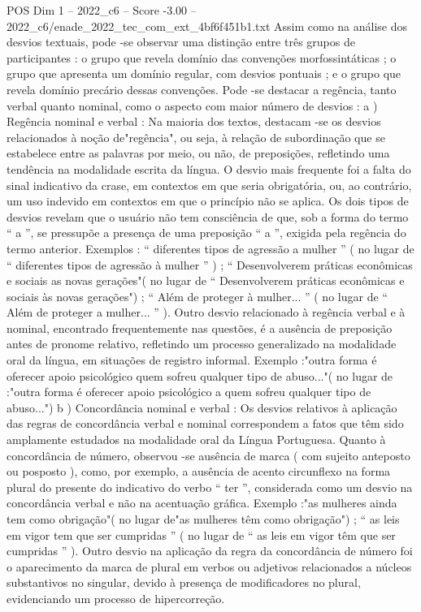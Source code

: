 \begin{textsample}{POS Dim 1 – 2022\_c6 – Score -3.00 – 2022\_c6/enade\_2022\_tec\_com\_ext\_4bf6f451b1.txt}
Assim como na análise dos desvios textuais, pode -se observar uma distinção entre três grupos de participantes : o grupo que revela domínio das convenções morfossintáticas ; o grupo que apresenta um domínio regular, com desvios pontuais ; e o grupo que revela domínio precário dessas convenções.
Pode -se destacar a regência, tanto verbal quanto nominal, como o aspecto com maior número de desvios : a ) Regência nominal e verbal : Na maioria dos textos, destacam -se os desvios relacionados à noção de"regência", ou seja, à relação de subordinação que se estabelece entre as palavras por meio, ou não, de preposições, refletindo uma tendência na modalidade escrita da língua.
O desvio mais frequente foi a falta do sinal indicativo da crase, em contextos em que seria obrigatória, ou, ao contrário, um uso indevido em contextos em que o princípio não se aplica.
Os dois tipos de desvios revelam que o usuário não tem consciência de que, sob a forma do termo “ a ”, se pressupõe a presença de uma preposição “ a ”, exigida pela regência do termo anterior.
Exemplos : “ diferentes tipos de agressão a mulher ” ( no lugar de “ diferentes tipos de agressão à mulher ” ) ; “ Desenvolverem práticas econômicas e sociais as novas gerações"( no lugar de “ Desenvolverem práticas econômicas e sociais às novas gerações") ; “ Além de proteger à mulher... ” ( no lugar de “ Além de proteger a mulher... ” ).
Outro desvio relacionado à regência verbal e à nominal, encontrado frequentemente nas questões, é a ausência de preposição antes de pronome relativo, refletindo um processo generalizado na modalidade oral da língua, em situações de registro informal.
Exemplo :"outra forma é oferecer apoio psicológico quem sofreu qualquer tipo de abuso..."( no lugar de :"outra forma é oferecer apoio psicológico a quem sofreu qualquer tipo de abuso...") b ) Concordância nominal e verbal : Os desvios relativos à aplicação das regras de concordância verbal e nominal correspondem a fatos que têm sido amplamente estudados na modalidade oral da Língua Portuguesa.
Quanto à concordância de número, observou -se ausência de marca ( com sujeito anteposto ou posposto ), como, por exemplo, a ausência de acento circunflexo na forma plural do presente do indicativo do verbo “ ter ”, considerada como um desvio na concordância verbal e não na acentuação gráfica.
Exemplo :"as mulheres ainda tem como obrigação"( no lugar de"as mulheres têm como obrigação") ; “ as leis em vigor tem que ser cumpridas ” ( no lugar de “ as leis em vigor têm que ser cumpridas ” ).
Outro desvio na aplicação da regra da concordância de número foi o aparecimento da marca de plural em verbos ou adjetivos relacionados a núcleos substantivos no singular, devido à presença de modificadores no plural, evidenciando um processo de hipercorreção.

\end{textsample}
